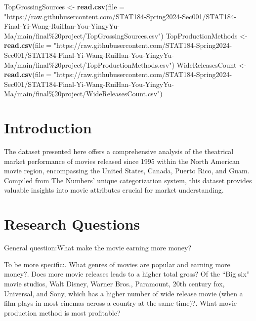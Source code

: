 \documentclass[
]{article}
\newenvironment{Shaded}{\begin{snugshade}}{\end{snugshade}}
\newcommand{\AttributeTok}[1]{\textcolor[rgb]{0.13,0.29,0.53}{#1}}
\newcommand{\FunctionTok}[1]{\textcolor[rgb]{0.13,0.29,0.53}{\textbf{#1}}}
\newcommand{\NormalTok}[1]{#1}
\newcommand{\OtherTok}[1]{\textcolor[rgb]{0.56,0.35,0.01}{#1}}
\newcommand{\StringTok}[1]{\textcolor[rgb]{0.31,0.60,0.02}{#1}}
\begin{document}
\begin{Shaded}
\begin{Highlighting}[]
\NormalTok{TopGrossingSources }\OtherTok{\textless{}{-}} \FunctionTok{read.csv}\NormalTok{(}\AttributeTok{file =} \StringTok{"https://raw.githubusercontent.com/STAT184{-}Spring2024{-}Sec001/STAT184{-}Final{-}Yi{-}Wang{-}RuiHan{-}You{-}YingyYu{-}Ma/main/final\%20project/TopGrossingSources.csv"}\NormalTok{)}
\NormalTok{TopProductionMethods }\OtherTok{\textless{}{-}} \FunctionTok{read.csv}\NormalTok{(}\AttributeTok{file =} \StringTok{"https://raw.githubusercontent.com/STAT184{-}Spring2024{-}Sec001/STAT184{-}Final{-}Yi{-}Wang{-}RuiHan{-}You{-}YingyYu{-}Ma/main/final\%20project/TopProductionMethods.csv"}\NormalTok{)}
\NormalTok{WideReleasesCount }\OtherTok{\textless{}{-}} \FunctionTok{read.csv}\NormalTok{(}\AttributeTok{file =} \StringTok{"https://raw.githubusercontent.com/STAT184{-}Spring2024{-}Sec001/STAT184{-}Final{-}Yi{-}Wang{-}RuiHan{-}You{-}YingyYu{-}Ma/main/final\%20project/WideReleasesCount.csv"}\NormalTok{)}
\end{Highlighting}
\end{Shaded}

\hypertarget{introduction}{%
\section{Introduction}\label{introduction}}

The dataset presented here offers a comprehensive analysis of the
theatrical market performance of movies released since 1995 within the
North American movie region, encompassing the United States, Canada,
Puerto Rico, and Guam. Compiled from The Numbers' unique categorization
system, this dataset provides valuable insights into movie attributes
crucial for market understanding.

\hypertarget{research-questions}{%
\section{Research Questions}\label{research-questions}}

General question:\n What make the movie earning more money?

To be more specific:. What genres of movies are popular and earning more money?. Does more movie releases leads to a higher total gross? Of the ``Big
six'' movie studios, Walt Disney, Warner Bros., Paramount, 20th century
fox, Universal, and Sony, which has a higher number of wide release
movie (when a film plays in most cinemas across a country at the same
time)?. What movie production method is most profitable?
\end{document}
